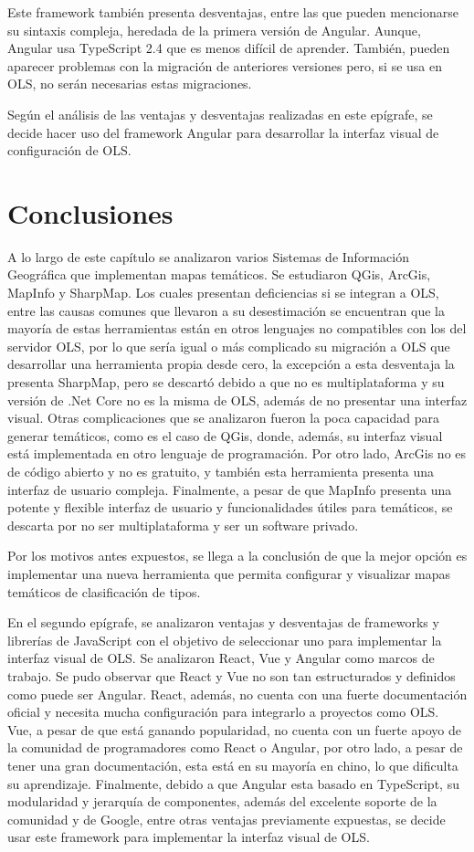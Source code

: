 Este framework tambi\'en presenta desventajas, entre las que pueden mencionarse su sintaxis compleja, heredada de la primera versi\'on de Angular. Aunque, Angular usa TypeScript 2.4 que es menos dif\'icil de aprender. Tambi\'en, pueden aparecer problemas con la migraci\'on de anteriores versiones pero, si se usa en OLS, no ser\'an necesarias estas migraciones.

Seg\'un el an\'alisis de las ventajas y desventajas realizadas en este ep\'igrafe, se decide hacer uso del framework Angular para desarrollar la interfaz visual de configuraci\'on de OLS.


\section{Conclusiones}
A lo largo de este cap\'itulo se analizaron varios Sistemas de Informaci\'on Geogr\'afica que implementan mapas tem\'aticos. Se estudiaron QGis, ArcGis, MapInfo y SharpMap. Los cuales presentan deficiencias si se integran a OLS, entre las causas comunes que llevaron a su desestimaci\'on se encuentran que la mayor\'ia de estas herramientas est\'an en otros lenguajes no compatibles con los del servidor OLS, por lo que ser\'ia igual o m\'as complicado su migraci\'on a OLS que desarrollar una herramienta propia desde cero, la excepci\'on a esta desventaja la presenta SharpMap, pero se descart\'o debido a que no es multiplataforma y su versi\'on de .Net Core no es la misma de OLS, adem\'as de no presentar una interfaz visual. Otras complicaciones que se analizaron fueron la poca capacidad para generar tem\'aticos, como es el caso de QGis, donde, adem\'as, su interfaz visual est\'a implementada en otro lenguaje de programaci\'on. Por otro lado, ArcGis no es de c\'odigo abierto y no es gratuito, y tambi\'en esta herramienta presenta una interfaz de usuario compleja. Finalmente, a pesar de que MapInfo presenta una potente y flexible interfaz de usuario y funcionalidades \'utiles para tem\'aticos, se descarta por no ser multiplataforma y ser un software privado.

Por los motivos antes expuestos, se llega a la conclusi\'on de que la mejor opci\'on es implementar una nueva herramienta que permita configurar y visualizar mapas tem\'aticos de clasificaci\'on de tipos.

En el segundo ep\'igrafe, se analizaron ventajas y desventajas de frameworks y librer\'ias de JavaScript con el objetivo de seleccionar uno para implementar la interfaz visual de OLS. Se analizaron React, Vue y Angular como marcos de trabajo. Se pudo observar que React y Vue no son tan estructurados y definidos como puede ser Angular. React, adem\'as, no cuenta con una fuerte documentaci\'on oficial y necesita mucha configuraci\'on para integrarlo a proyectos como OLS. Vue, a pesar de que est\'a ganando popularidad, no cuenta con un fuerte apoyo de la comunidad de programadores como React o Angular, por otro lado, a pesar de tener una gran documentaci\'on, esta est\'a en su mayor\'ia en chino, lo que dificulta su aprendizaje. Finalmente, debido a que Angular esta basado en TypeScript, su modularidad y jerarqu\'ia de componentes, adem\'as del excelente soporte de la comunidad y de Google, entre otras ventajas previamente expuestas, se decide usar este framework para implementar la interfaz visual de OLS.
